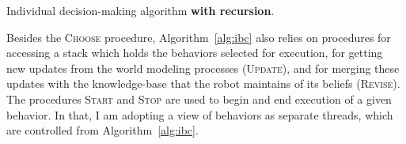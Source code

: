 \documentclass[3p,times]{elsarticle} %
\newcommand{\noun}[1]{\textsc{#1}}
\begin{document}
\begin{algorithm}[htbp]
\caption{Individual decision-making algorithm \textbf{with recursion}.}
\label{alg:ibc}

\end{algorithm}

Besides the \noun{Choose} procedure, Algorithm~\ref{alg:ibc} also relies on procedures for accessing a stack
which holds the behaviors selected for execution, for getting new updates from the world modeling processes
(\noun{Update}), and for merging these updates with the knowledge-base that the robot maintains of its
beliefs (\noun{Revise}).  The procedures \noun{Start} and \noun{Stop} are used to begin and end
execution of a given behavior. In that, I am adopting a view of behaviors as separate threads,
which are controlled from Algorithm~\ref{alg:ibc}.
\end{document}
